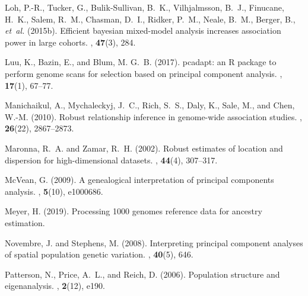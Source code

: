 \documentclass{bioinfo}
\begin{document}
\begin{thebibliography}{}
	Loh, P.-R., Tucker, G., Bulik-Sullivan, B.~K., Vilhjalmsson, B.~J., Finucane,
	H.~K., Salem, R.~M., Chasman, D.~I., Ridker, P.~M., Neale, B.~M., Berger, B.,
	{\em et~al.} (2015b).
	\newblock Efficient bayesian mixed-model analysis increases association power
	in large cohorts.
	, {\bf 47}(3), 284.
	
	Luu, K., Bazin, E., and Blum, M. G.~B. (2017).
	\newblock pcadapt: an {R} package to perform genome scans for selection based
	on principal component analysis.
	, {\bf 17}(1), 67--77.
	
	Manichaikul, A., Mychaleckyj, J.~C., Rich, S.~S., Daly, K., Sale, M., and Chen,
	W.-M. (2010).
	\newblock Robust relationship inference in genome-wide association studies.
	, {\bf 26}(22), 2867--2873.
	
	Maronna, R.~A. and Zamar, R.~H. (2002).
	\newblock Robust estimates of location and dispersion for high-dimensional
	datasets.
	, {\bf 44}(4), 307--317.
	
	McVean, G. (2009).
	\newblock A genealogical interpretation of principal components analysis.
	, {\bf 5}(10), e1000686.
	
	Meyer, H. (2019).
	\newblock Processing 1000 genomes reference data for ancestry estimation.
	
	Novembre, J. and Stephens, M. (2008).
	\newblock Interpreting principal component analyses of spatial population
	genetic variation.
	, {\bf 40}(5), 646.
	
	Patterson, N., Price, A.~L., and Reich, D. (2006).
	\newblock Population structure and eigenanalysis.
	, {\bf 2}(12), e190.
	

\end{thebibliography}
\end{document}
